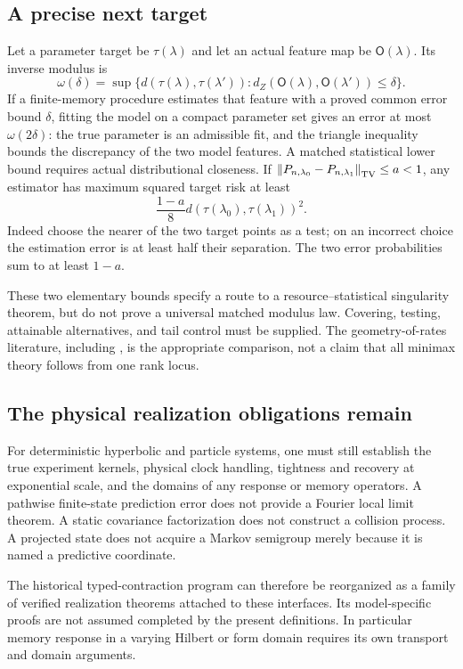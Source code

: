 \subsection{A precise next target}
Let a parameter target be $\tau(\lambda)$ and let an actual feature map
be $\mathsf O(\lambda)$. Its inverse modulus is
\[
 \omega(\delta)=\sup\{d(\tau(\lambda),\tau(\lambda')):
   d_Z(\mathsf O(\lambda),\mathsf O(\lambda'))\le\delta\}.
\]
If a finite-memory procedure estimates that feature with a proved common
error bound $\delta$, fitting the model on a compact parameter set gives
an error at most $\omega(2\delta)$: the true parameter is an admissible
fit, and the triangle inequality bounds the discrepancy of the two model
features. A matched statistical lower bound requires actual distributional
closeness. If
$\left\lVert P_{n,\lambda_0}-P_{n,\lambda_1}\right\rVert_{\mathrm{TV}}\le a<1$, any estimator
has maximum squared target risk at least
\[
 \frac{1-a}{8}
 d(\tau(\lambda_0),\tau(\lambda_1))^2.
\]
Indeed choose the nearer of the two target points as a test; on an incorrect
choice the estimation error is at least half their separation. The two
error probabilities sum to at least $1-a$.

These two elementary bounds specify a route to a resource--statistical
singularity theorem, but do not prove a universal matched modulus law.
Covering, testing, attainable alternatives, and tail control must be supplied.
The geometry-of-rates literature, including \cite{DonohoLiu1991}, is the
appropriate comparison, not a claim that all minimax theory follows from
one rank locus.

\subsection{The physical realization obligations remain}
For deterministic hyperbolic and particle systems, one must still establish
the true experiment kernels, physical clock handling, tightness and
recovery at exponential scale, and the domains of any response or memory
operators. A pathwise finite-state prediction error does not provide a
Fourier local limit theorem. A static covariance factorization does not
construct a collision process. A projected state does not acquire a Markov
semigroup merely because it is named a predictive coordinate.

The historical typed-contraction program \cite{QiC2} can therefore be
reorganized as a family of verified realization theorems attached to these
interfaces. Its model-specific proofs are not assumed completed by the
present definitions. In particular memory response in a varying Hilbert
or form domain requires its own transport and domain arguments.

